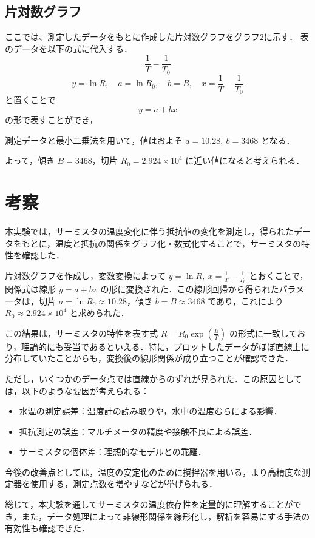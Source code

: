 \documentclass[a4paper,11pt,dvipdfmx]{jsarticle}
\begin{document}
\subsection{片対数グラフ}
ここでは、測定したデータをもとに作成した片対数グラフをグラフ2に示す．
\newpage
表のデータを以下の式に代入する．
\[
\frac{1}{T} - \frac{1}{T_0}
\]
\[
y = \ln R,\quad a = \ln R_0,\quad b = B,\quad x = \frac{1}{T} - \frac{1}{T_0}
\]
と置くことで
\[
y = a + bx
\]
の形で表すことができ，

測定データと最小二乗法を用いて，値はおよそ \( a = 10.28,\ b = 3468 \) となる．

よって，傾き \( B = 3468 \)，切片 \( R_0 = 2.924 \times 10^4 \) に近い値になると考えられる．

\section{考察}
本実験では，サーミスタの温度変化に伴う抵抗値の変化を測定し，得られたデータをもとに，温度と抵抗の関係をグラフ化・数式化することで，サーミスタの特性を確認した．

片対数グラフを作成し，変数変換によって \( y = \ln R,\ x = \frac{1}{T} - \frac{1}{T_0} \) とおくことで，関係式は線形 \( y = a + bx \) の形に変換された．この線形回帰から得られたパラメータは，切片 \( a = \ln R_0 \approx 10.28 \)，傾き \( b = B \approx 3468 \) であり，これにより \( R_0 \approx 2.924 \times 10^4 \) と求められた．

この結果は，サーミスタの特性を表す式 \( R = R_0 \exp\left( \frac{B}{T} \right) \) の形式に一致しており，理論的にも妥当であるといえる．特に，プロットしたデータがほぼ直線上に分布していたことからも，変換後の線形関係が成り立つことが確認できた．

ただし，いくつかのデータ点では直線からのずれが見られた．この原因としては，以下のような要因が考えられる：

\begin{itemize}
    \item 水温の測定誤差：温度計の読み取りや，水中の温度むらによる影響．
    \item 抵抗測定の誤差：マルチメータの精度や接触不良による誤差．
    \item サーミスタの個体差：理想的なモデルとの乖離．
\end{itemize}

今後の改善点としては，温度の安定化のために撹拌器を用いる，より高精度な測定器を使用する，測定点数を増やすなどが挙げられる．

総じて，本実験を通してサーミスタの温度依存性を定量的に理解することができ，また，データ処理によって非線形関係を線形化し，解析を容易にする手法の有効性も確認できた．
\end{document}
